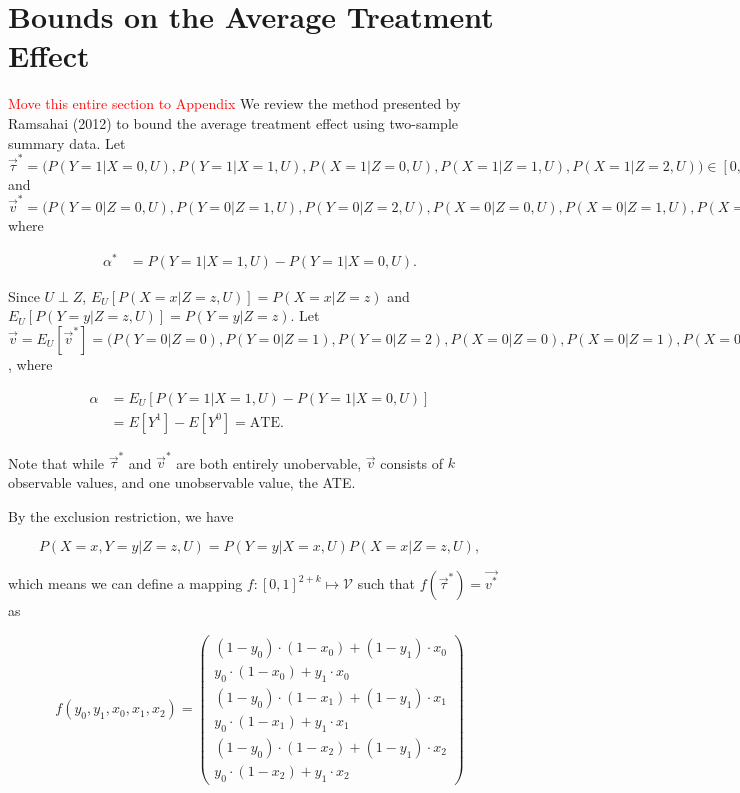 \documentclass[
]{article}
\theoremstyle{plain}
\begin{document}
{\newpage

\hypertarget{bounds-on-average-treatment-effect}{%
\section{Bounds on the Average Treatment Effect}\label{bounds-on-average-treatment-effect}}
\textcolor{red}{Move this entire section to Appendix}
We review the method presented by Ramsahai (2012) to bound the average treatment effect using two-sample summary data. Let \(\vec{\tau}^* = \Big(P(Y = 1 | X = 0, U), P(Y = 1 | X = 1, U), P(X = 1 | Z = 0, U), P(X = 1 | Z = 1, U), P(X=1 | Z = 2, U) \Big) \in [0,1]^{5}\) and \(\vec{v}^* = \Big(P(Y = 0 | Z = 0, U),P(Y = 0 | Z = 1, U), P(Y = 0 | Z = 2, U), P(X = 0 | Z = 0, U),P(X = 0 | Z = 1, U), P(X=0 | Z= 2, U), \alpha^*\Big)\) where

\[
\begin{aligned}
\alpha^* &= P(Y = 1 | X = 1, U) - P(Y = 1 | X = 0, U).
\end{aligned}
\]

Since \(U \perp Z\), \(E_U[P(X = x | Z = z, U)] = P(X = x | Z = z)\) and \(E_U[P(Y = y | Z = z, U)] = P(Y = y | Z = z)\). Let \(\vec{v} = E_U[\vec{v}^*] = \Big(P(Y = 0 | Z = 0), P(Y = 0 | Z = 1),P(Y = 0 | Z = 2), P(X = 0 | Z = 0), P(X = 0 | Z = 1),P(X = 0 | Z = 2), \alpha \Big)\), where

\[
\begin{aligned}
\alpha &= E_U[P(Y = 1 | X = 1, U) - P(Y = 1 | X = 0, U)] \\
       &= E[Y^1] - E[Y^0] = \text{ATE}.
\end{aligned}
\]

Note that while \(\vec{\tau}^*\) and \(\vec{v}^*\) are both entirely unobervable, \(\vec{v}\) consists of \(k\) observable values, and one unobservable value, the ATE.

By the exclusion restriction, we have

\[
P(X = x, Y = y | Z = z, U) = P(Y = y | X = x, U) P(X = x | Z = z, U),
\]

which means we can define a mapping \(f:[0,1]^{2+k} \mapsto \mathcal{V}\) such that \(f(\vec{\tau}^*) = \vec{v^*}\) as

\[
f(y_0, y_1, x_0, x_1, x_2) = 
  \begin{pmatrix} 
    (1-y_0)\cdot(1-x_0) + (1 - y_1)\cdot x_0 \\
    y_0\cdot (1-x_0) + y_1\cdot x_0 \\
        (1-y_0)\cdot(1-x_1) + (1 - y_1)\cdot x_1 \\
    y_0\cdot (1-x_1) + y_1\cdot x_1 \\
            (1-y_0)\cdot(1-x_2) + (1 - y_1)\cdot x_2 \\
    y_0\cdot (1-x_2) + y_1\cdot x_2 
  \end{pmatrix} \label{eq:f}
\]

}
\end{document}
